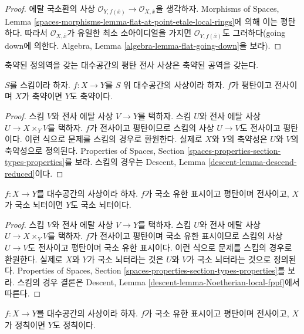 \begin{proof}
에탈 국소환의 사상
$\mathcal{O}_{Y,f(\overline{x})}\to\mathcal{O}_{X,\overline{x}}$을
생각하자. Morphisms of Spaces, Lemma
\ref{spaces-morphisms-lemma-flat-at-point-etale-local-rings}에 의해 이는
평탄하다. 따라서 $\mathcal{O}_{X,\overline{x}}$가 유일한 최소
소아이디얼을 가지면 $\mathcal{O}_{Y,f(\overline{x})}$도 그러하다(going
down에 의한다. Algebra, Lemma \ref{algebra-lemma-flat-going-down}을 보라).
\end{proof}

\begin{lemma}
\label{lemma-descend-reduced}
\begin{slogan}
축약된 정의역을 갖는 대수공간의 평탄 전사 사상은 축약된 공역을 갖는다.
\end{slogan}
$S$를 스킴이라 하자. $f:X\to Y$를 $S$ 위 대수공간의 사상이라 하자.
$f$가 평탄이고 전사이며 $X$가 축약이면 $Y$도 축약이다.
\end{lemma}

\begin{proof}
스킴 $V$와 전사 에탈 사상 $V\to Y$를 택하자. 스킴 $U$와 전사 에탈
사상 $U\to X\times_YV$를 택하자. $f$가 전사이고 평탄이므로 스킴의 사상
$U\to V$도 전사이고 평탄이다. 이런 식으로 문제를 스킴의 경우로
환원한다. 실제로 $X$와 $Y$의 축약성은 $U$와 $V$의 축약성으로 정의된다.
Properties of Spaces, Section
\ref{spaces-properties-section-types-properties}를 보라. 스킴의 경우는
Descent, Lemma \ref{descent-lemma-descend-reduced}이다.
\end{proof}

\begin{lemma}
\label{lemma-descend-locally-Noetherian}
$f:X\to Y$를 대수공간의 사상이라 하자. $f$가 국소 유한 표시이고
평탄이며 전사이고, $X$가 국소 뇌터이면 $Y$도 국소 뇌터이다.
\end{lemma}

\begin{proof}
스킴 $V$와 전사 에탈 사상 $V\to Y$를 택하자. 스킴 $U$와 전사 에탈
사상 $U\to X\times_YV$를 택하자. $f$가 전사이고 평탄이며 국소 유한
표시이므로 스킴의 사상 $U\to V$도 전사이고 평탄이며 국소 유한 표시이다.
이런 식으로 문제를 스킴의 경우로 환원한다. 실제로 $X$와 $Y$가 국소
뇌터라는 것은 $U$와 $V$가 국소 뇌터라는 것으로 정의된다. Properties
of Spaces, Section \ref{spaces-properties-section-types-properties}를 보라.
스킴의 경우 결론은 Descent, Lemma
\ref{descent-lemma-Noetherian-local-fppf}에서 따른다.
\end{proof}

\begin{lemma}
\label{lemma-descend-regular}
$f:X\to Y$를 대수공간의 사상이라 하자. $f$가 국소 유한 표시이고
평탄이며 전사이고, $X$가 정칙이면 $Y$도 정칙이다.
\end{lemma}

